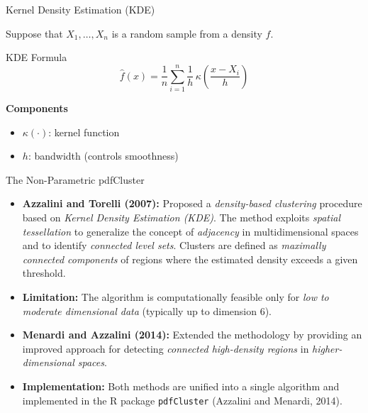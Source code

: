 \begin{frame}{Kernel Density Estimation (KDE)}

Suppose that $X_1, \ldots, X_n$ is a random sample from a density $f$.

\vspace{0.3cm}

\begin{exampleblock}{KDE Formula}
\[
\hat{f}(x) = \frac{1}{n} \sum_{i=1}^{n} \frac{1}{h} \, \kappa\!\left(\frac{x - X_i}{h}\right)
\]
\end{exampleblock}

\vspace{0.3cm}

\textbf{Components}
\begin{itemize}
    \item $\kappa(\cdot)$: kernel function
    \item $h$: bandwidth (controls smoothness)
\end{itemize}

\end{frame}
\begin{frame}{The Non-Parametric pdfCluster}
\begin{itemize}
    \item \textbf{Azzalini and Torelli (2007):} Proposed a \textit{density-based clustering} procedure based on \textit{Kernel Density Estimation (KDE)}. The method exploits \textit{spatial tessellation} to generalize the concept of \textit{adjacency} in multidimensional spaces and to identify \textit{connected level sets}. Clusters are defined as \textit{maximally connected components} of regions where the estimated density exceeds a given threshold.

    \item \textbf{Limitation:} The algorithm is computationally feasible only for \textit{low to moderate dimensional data} (typically up to dimension 6).

    \item \textbf{Menardi and Azzalini (2014):} Extended the methodology by providing an improved approach for detecting \textit{connected high-density regions} in \textit{higher-dimensional spaces}.

    \item \textbf{Implementation:} Both methods are unified into a single algorithm and implemented in the R package \texttt{pdfCluster} (Azzalini and Menardi, 2014).
\end{itemize}
    
\end{frame}


